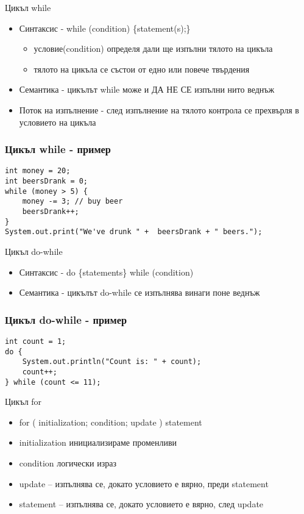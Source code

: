 \documentclass{beamer}
\begin{document}
\begin{frame}{Цикъл while}
  \begin{itemize}
  \item Синтаксис - while (condition) \{statement(s);\}
    \begin{itemize}
      \item условие(condition) определя дали ще изпълни тялото на цикъла
      \item тялото на цикъла се състои от едно или повече твърдения
    \end{itemize}

  \item Семантика - цикълът while може и ДА НЕ СЕ изпълни нито веднъж
  \item Поток на изпълнение - след изпълнение на тялото контрола се
    прехвърля в условието на цикъла
  \end{itemize}
\end{frame}

\begin{frame}[fragile]
  \frametitle{Цикъл while - пример}
\begin{lstlisting}
int money = 20;
int beersDrank = 0;
while (money > 5) {
    money -= 3; // buy beer
    beersDrank++;
}
System.out.print("We've drunk " +  beersDrank + " beers.");
\end{lstlisting}
\end{frame}

\begin{frame}{Цикъл do-while}
  \begin{itemize}
  \item Синтаксис - do \{statements\} while (condition)
  \item Семантика - цикълът do-while се изпълнява винаги поне веднъж
  \end{itemize}
\end{frame}

\begin{frame}[fragile]
  \frametitle{Цикъл do-while - пример}
\begin{lstlisting}
int count = 1;
do {
    System.out.println("Count is: " + count);
    count++;
} while (count <= 11);
\end{lstlisting}
\end{frame}

\begin{frame}{Цикъл for}
  \begin{itemize}
  \item   for ( initialization; condition; update )  {statement}
    \item initialization инициализираме променливи
    \item condition логически израз
    \item update – изпълнява се, докато
    условието е вярно, преди statement

    \item statement – изпълнява се, докато
    условието е вярно, след update

  \end{itemize}
\end{frame}
\end{document}
